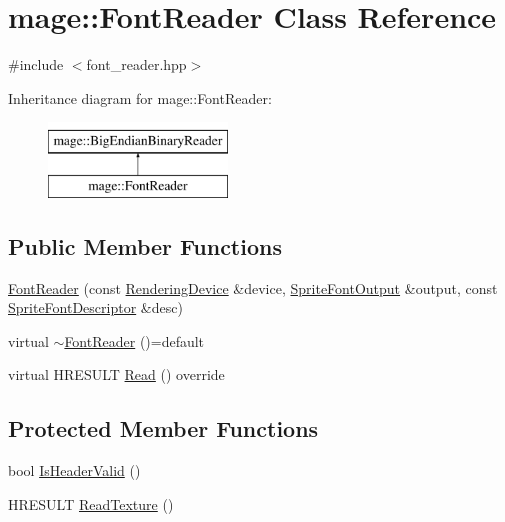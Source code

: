 \hypertarget{classmage_1_1_font_reader}{}\section{mage\+:\+:Font\+Reader Class Reference}
\label{classmage_1_1_font_reader}


{\ttfamily \#include $<$font\+\_\+reader.\+hpp$>$}

Inheritance diagram for mage\+:\+:Font\+Reader\+:\begin{figure}[H]
\begin{center}
\leavevmode
\includegraphics[height=2.000000cm]{classmage_1_1_font_reader}
\end{center}
\end{figure}
\subsection*{Public Member Functions}
\begin{DoxyCompactItemize}
\item 
\hyperlink{classmage_1_1_font_reader_af12a19e622ed3ca55566f916f44184a6}{Font\+Reader} (const \hyperlink{classmage_1_1_rendering_device}{Rendering\+Device} \&device, \hyperlink{structmage_1_1_sprite_font_output}{Sprite\+Font\+Output} \&output, const \hyperlink{structmage_1_1_sprite_font_descriptor}{Sprite\+Font\+Descriptor} \&desc)
\item 
virtual \hyperlink{classmage_1_1_font_reader_afcc9234d16d83d1451d2413006fc9d83}{$\sim$\+Font\+Reader} ()=default
\item 
virtual H\+R\+E\+S\+U\+LT \hyperlink{classmage_1_1_font_reader_af802d9181c0556b82fa701b5c940068d}{Read} () override
\end{DoxyCompactItemize}
\subsection*{Protected Member Functions}
\begin{DoxyCompactItemize}
\item 
bool \hyperlink{classmage_1_1_font_reader_a3fe3dfd3f2be8e156396ae8e7cfec551}{Is\+Header\+Valid} ()
\item 
H\+R\+E\+S\+U\+LT \hyperlink{classmage_1_1_font_reader_a9bdb734bbd8d3859fe34672fafa1a760}{Read\+Texture} ()
\end{DoxyCompactItemize}
